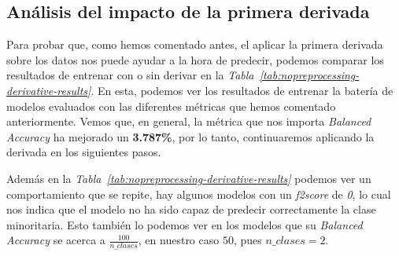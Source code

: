 \subsection{Análisis del impacto de la primera derivada}

Para probar que, como hemos comentado antes, el aplicar la primera derivada sobre los datos nos puede ayudar a la hora de predecir, podemos comparar los resultados de entrenar con o sin derivar en la \textit{Tabla\ \ref{tab:nopreprocessing-derivative-results}}. En esta, podemos ver los resultados de entrenar la batería de modelos evaluados con las diferentes métricas que hemos comentado anteriormente. Vemos que, en general, la métrica que nos importa \textit{Balanced Accuracy} ha mejorado un \textbf{3.787\%}, por lo tanto, continuaremos aplicando la derivada en los siguientes pasos.

Además en la \textit{Tabla\ \ref{tab:nopreprocessing-derivative-results}} podemos ver un comportamiento que se repite, hay algunos modelos con un \textit{f2score} de \textit{0}, lo cual nos indica que el modelo no ha sido capaz de predecir correctamente la clase minoritaria. Esto también lo podemos ver en los modelos que su \textit{Balanced Accuracy} se acerca a $\frac{100}{n\_clases}$, en nuestro caso $50$, pues $n\_clases=2$.


